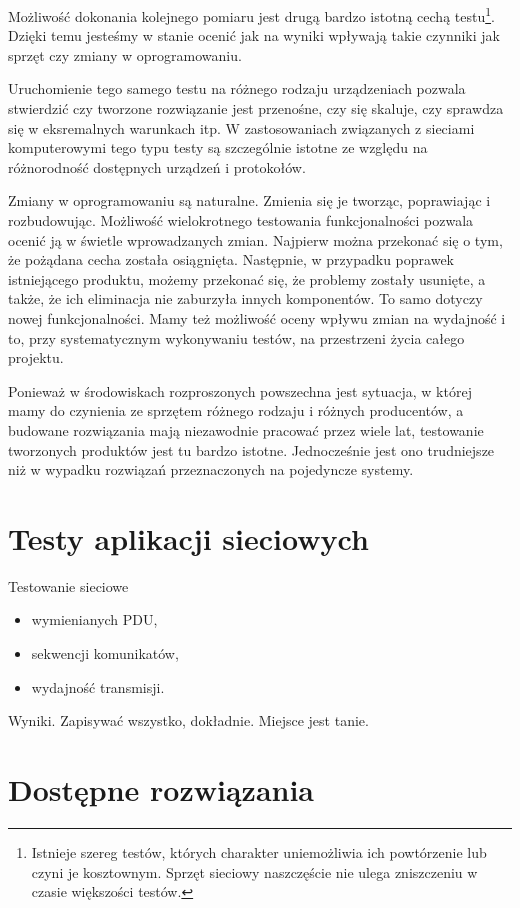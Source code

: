 \documentclass[00-praca-magisterska.tex]{subfiles}
\begin{document}
Możliwość dokonania kolejnego pomiaru jest drugą bardzo istotną cechą
testu\footnote{Istnieje szereg testów, których charakter uniemożliwia ich
powtórzenie lub czyni je kosztownym. Sprzęt sieciowy naszczęście nie ulega
zniszczeniu w czasie większości testów.}. Dzięki temu jesteśmy w stanie ocenić
jak na wyniki wpływają takie czynniki jak sprzęt czy zmiany w oprogramowaniu.

Uruchomienie tego samego testu na różnego rodzaju urządzeniach pozwala
stwierdzić czy tworzone rozwiązanie jest przenośne, czy się skaluje, czy
sprawdza się w eksremalnych warunkach itp. W zastosowaniach związanych z
sieciami komputerowymi tego typu testy są szczególnie istotne ze względu na
różnorodność dostępnych urządzeń i protokołów.

Zmiany w oprogramowaniu są naturalne. Zmienia się je tworząc, poprawiając i
rozbudowując. Możliwość wielokrotnego testowania funkcjonalności pozwala ocenić
ją w świetle wprowadzanych zmian. Najpierw można przekonać się o tym, że
pożądana cecha została osiągnięta. Następnie, w przypadku poprawek istniejącego
produktu, możemy przekonać się, że problemy zostały usunięte, a także, że ich
eliminacja nie zaburzyła innych komponentów. To samo dotyczy nowej
funkcjonalności. Mamy też możliwość oceny wpływu zmian na wydajność i to, przy
systematycznym wykonywaniu testów, na przestrzeni życia całego projektu.

Ponieważ w środowiskach rozproszonych powszechna jest sytuacja, w której mamy
do czynienia ze sprzętem różnego rodzaju i różnych producentów, a budowane
rozwiązania mają niezawodnie pracować przez wiele lat, testowanie tworzonych
produktów jest tu bardzo istotne. Jednocześnie jest ono trudniejsze niż w
wypadku rozwiązań przeznaczonych na pojedyncze systemy.

\section{Testy aplikacji sieciowych}

Testowanie sieciowe
\begin{itemize}
  \item{wymienianych PDU,}
  \item{sekwencji komunikatów,}
  \item{wydajność transmisji.}
\end{itemize}

Wyniki. Zapisywać wszystko, dokładnie. Miejsce jest tanie.

\section{Dostępne rozwiązania}
\end{document}
